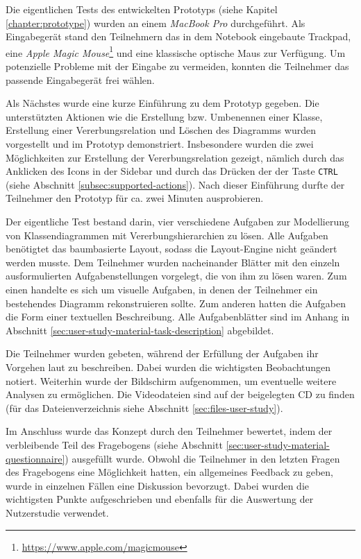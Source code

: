 Die eigentlichen Tests des entwickelten Prototyps (siehe Kapitel \ref{chapter:prototype}) wurden an einem \textit{MacBook Pro} durchgeführt. Als Eingabegerät stand den Teilnehmern das in dem Notebook eingebaute Trackpad, eine \textit{Apple Magic Mouse}\footnote{\url{https://www.apple.com/magicmouse}} und eine klassische optische Maus zur Verfügung. Um potenzielle Probleme mit der Eingabe zu vermeiden, konnten die Teilnehmer das passende Eingabegerät frei wählen.

Als Nächstes wurde eine kurze Einführung zu dem Prototyp gegeben. Die unterstützten Aktionen wie die Erstellung bzw. Umbenennen einer Klasse, Erstellung einer Vererbungsrelation und Löschen des Diagramms wurden vorgestellt und im Prototyp demonstriert. Insbesondere wurden die zwei Möglichkeiten zur Erstellung der Vererbungsrelation gezeigt, nämlich durch das Anklicken des Icons in der Sidebar und durch das Drücken der der Taste \texttt{CTRL} (siehe Abschnitt \ref{subsec:supported-actions}). Nach dieser Einführung durfte der Teilnehmer den Prototyp für ca. zwei Minuten ausprobieren.

Der eigentliche Test bestand darin, vier verschiedene Aufgaben zur Modellierung von Klassendiagrammen mit Vererbungshierarchien zu lösen. Alle Aufgaben benötigtet das baumbasierte Layout, sodass die Lay\-out-Engine nicht geändert werden musste. Dem Teilnehmer wurden nacheinander Blätter mit den einzeln ausformulierten Aufgabenstellungen vorgelegt, die von ihm zu lösen waren. Zum einen handelte es sich um visuelle Aufgaben, in denen der Teilnehmer ein bestehendes Diagramm rekonstruieren sollte. Zum anderen hatten die Aufgaben die Form einer textuellen Beschreibung. Alle Aufgabenblätter sind im Anhang in Abschnitt \ref{sec:user-study-material-task-description} abgebildet.

Die Teilnehmer wurden gebeten, während der Erfüllung der Aufgaben ihr Vorgehen laut zu beschreiben. Dabei wurden die wichtigsten Beobachtungen notiert. Weiterhin wurde der Bildschirm aufgenommen, um eventuelle weitere Analysen zu ermöglichen. Die Videodateien sind auf der beigelegten CD zu finden (für das Dateienverzeichnis siehe Abschnitt \ref{sec:files-user-study}).

Im Anschluss wurde das Konzept durch den Teilnehmer bewertet, indem der verbleibende Teil des Fragebogens (siehe Abschnitt \ref{sec:user-study-material-questionnaire}) ausgefüllt wurde. Obwohl die Teilnehmer in den letzten Fragen des Fragebogens eine Möglichkeit hatten, ein allgemeines Feedback zu geben, wurde in einzelnen Fällen eine Diskussion bevorzugt. Dabei wurden die wichtigsten Punkte aufgeschrieben und ebenfalls für die Auswertung der Nutzerstudie verwendet.

